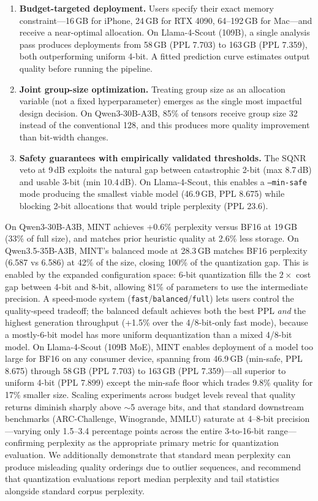 \documentclass{article}
\begin{document}
\begin{enumerate}
    \item \textbf{Budget-targeted deployment.} Users specify their exact memory constraint---16\,GB for iPhone, 24\,GB for RTX 4090, 64--192\,GB for Mac---and receive a near-optimal allocation. On Llama-4-Scout (109B), a single analysis pass produces deployments from 58\,GB (PPL 7.703) to 163\,GB (PPL 7.359), both outperforming uniform 4-bit. A fitted prediction curve estimates output quality before running the pipeline.
    \item \textbf{Joint group-size optimization.} Treating group size as an allocation variable (not a fixed hyperparameter) emerges as the single most impactful design decision. On Qwen3-30B-A3B, 85\% of tensors receive group size 32 instead of the conventional 128, and this produces more quality improvement than bit-width changes.
    \item \textbf{Safety guarantees with empirically validated thresholds.} The SQNR veto at 9\,dB exploits the natural gap between catastrophic 2-bit (max 8.7\,dB) and usable 3-bit (min 10.4\,dB). On Llama-4-Scout, this enables a \texttt{--min-safe} mode producing the smallest viable model (46.9\,GB, PPL 8.675) while blocking 2-bit allocations that would triple perplexity (PPL 23.6).
\end{enumerate}

On Qwen3-30B-A3B, MINT achieves +0.6\% perplexity versus BF16 at 19\,GB (33\% of full size), and matches prior heuristic quality at 2.6\% less storage. On Qwen3.5-35B-A3B, MINT's balanced mode at 28.3\,GB matches BF16 perplexity (6.587 vs 6.586) at 42\% of the size, closing 100\% of the quantization gap. This is enabled by the expanded configuration space: 6-bit quantization fills the $2\times$ cost gap between 4-bit and 8-bit, allowing 81\% of parameters to use the intermediate precision. A speed-mode system (\texttt{fast}/\texttt{balanced}/\texttt{full}) lets users control the quality-speed tradeoff; the balanced default achieves both the best PPL \emph{and} the highest generation throughput (+1.5\% over the 4/8-bit-only fast mode), because a mostly-6-bit model has more uniform dequantization than a mixed 4/8-bit model. On Llama-4-Scout (109B MoE), MINT enables deployment of a model too large for BF16 on any consumer device, spanning from 46.9\,GB (min-safe, PPL 8.675) through 58\,GB (PPL 7.703) to 163\,GB (PPL 7.359)---all superior to uniform 4-bit (PPL 7.899) except the min-safe floor which trades 9.8\% quality for 17\% smaller size. Scaling experiments across budget levels reveal that quality returns diminish sharply above ${\sim}$5 average bits, and that standard downstream benchmarks (ARC-Challenge, Winogrande, MMLU) saturate at 4--8-bit precision---varying only 1.5--3.4 percentage points across the entire 3-to-16-bit range---confirming perplexity as the appropriate primary metric for quantization evaluation. We additionally demonstrate that standard mean perplexity can produce misleading quality orderings due to outlier sequences, and recommend that quantization evaluations report median perplexity and tail statistics alongside standard corpus perplexity.
\end{document}
